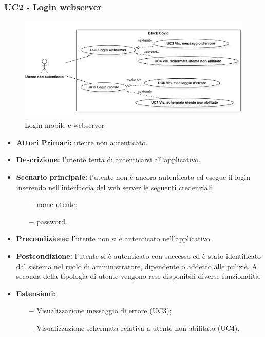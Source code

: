 \subsubsection{ UC2 - Login webserver}
\begin{figure}[H]
	\centering
	\includegraphics[width=18cm]{res/images/UC2-3-4-5-6-7.png}
	\caption{Login mobile e webserver}
\end{figure}
\begin{itemize}
           	\item\textbf{Attori Primari:} utente non autenticato.
           	\item\textbf{Descrizione:} l’utente tenta di autenticarsi all'applicativo.
           	\item\textbf{Scenario principale:} l’utente non è ancora autenticato ed esegue il login inserendo nell'interfaccia del web server le seguenti credenziali:
           	\begin{itemize}
           		\item[$-$] nome utente;
           		\item[$-$] password.
           	\end{itemize}
           	\item\textbf{Precondizione:} l’utente non si è autenticato nell'applicativo. 
           	\item\textbf{Postcondizione:} l’utente si è autenticato con successo ed è stato identificato dal sistema nel ruolo di amministratore, dipendente o addetto alle pulizie. A seconda della tipologia di utente vengono rese
           	disponibili diverse funzionalità.
           	\item\textbf{Estensioni:}
           	\begin{itemize}
           		\item[$-$] Visualizzazione messaggio di errore (UC3);
           		\item[$-$] Visualizzazione schermata relativa a utente non abilitato (UC4).
           	\end{itemize}
\end{itemize}

